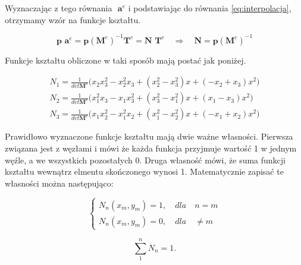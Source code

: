 Wyznaczając z tego równania \( \textbf{ a}^e  \) i podstawiając do równania \ref{eq:interpolacja}, otrzymamy wzór na funkcje kształtu.

\begin{equation}
\textbf{p a}^e = \textbf{p} {(\textbf{M}^e)}^{-1} \textbf{T}^e  = \textbf{N T}^e   \quad \Rightarrow \quad \textbf{N} = \textbf{p} {(\textbf{M}^e)}^{-1}
\end{equation}

Funkcje kształtu obliczone w taki sposób mają postać jak poniżej.

\begin{equation}
\begin{aligned}
N_1 = \frac{1}{det\textbf{M}^e} \big(x_2 x_3^2 - x_2^2 x_3 + (x_2^2 - x_3^2)x + (-x_2 + x_3)x^2\big) \\
N_2 = \frac{1}{det\textbf{M}^e} \big(x_1^2 x_3 - x_1 x_3^2 + (x_3^2 - x_1^2)x + (x_1 - x_3)x^2\big) \\
N_3 = \frac{1}{det\textbf{M}^e} \big(x_1 x_2^2 - x_1^2 x_2 + (x_1^2 - x_2^2)x + (-x_1 + x_2)x^2\big)
\end{aligned}
\end{equation}

Prawidłowo wyznaczone funkcje kształtu mają dwie ważne własności. Pierwsza związana jest z węzłami i mówi że każda funkcja przyjmuje wartość 1 w jednym węźle, a we wszystkich pozostałych 0. Druga własność mówi, że suma funkcji kształtu wewnątrz elmentu skończonego wynosi 1. Matematycznie zapisać te własności można następująco:

 \begin{equation} \label{eq:eq_zgodnosc}
	\left\{
                \begin{array}{ll}
		N_n(x_m, y_m) = 1, \quad dla \quad n=m \\
		N_n(x_m, y_m) = 0, \quad dla \quad \neq m 
                \end{array}
	\right.
 \end{equation}

 \begin{equation} \label{eq:WBS}
	\sum_1^n N_n = 1.
 \end{equation}























